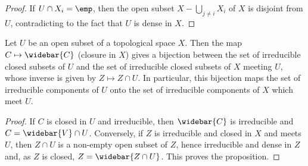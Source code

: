 \begin{proof}
If $U\cap X_i=\emp$, then the open subset $X-\bigcup_{j\neq i}X_i$ of $X$ is disjoint from $U$, contradicting to the fact that $U$ is dense in $X$.
\end{proof}
\begin{proposition}\label{topo space open irre closed intersection}
Let $U$ be an open subset of a topological space $X$. Then the map $C\mapsto\widebar{C}$ (closure in $X$) gives a bijection between the set of irreducible closed subsets of $U$ and the set of irreducible closed subsets of $X$ meeting $U$, whose inverse is given by $Z\mapsto Z\cap U$. In particular, this bijection maps the set of irreducible components of $U$ onto the set of irreducible components of $X$ which meet $U$.
\end{proposition}
\begin{proof}
If $C$ is closed in $U$ and irreducible, then $\widebar{C}$ is irreducible and $C=\widebar{V}\cap U$. Conversely, if $Z$ is irreducible and closed in $X$ and meets $U$, then $Z\cap U$ is a non-empty open subset of $Z$, hence irreducible and dense in $Z$ and, as $Z$ is closed, $Z=\widebar{Z\cap U}$. This proves the proposition.
\end{proof}
